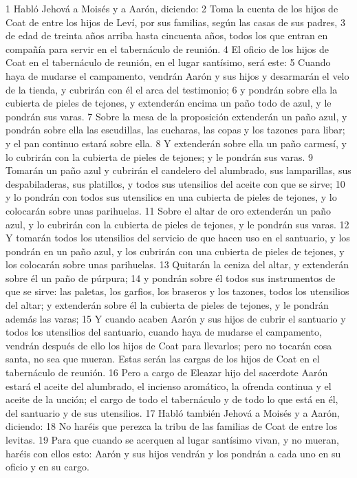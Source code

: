 1 Habló Jehová a Moisés y a Aarón, diciendo:
2 Toma la cuenta de los hijos de Coat de entre los hijos de Leví, por sus familias, según las casas de sus padres,
3 de edad de treinta años arriba hasta cincuenta años, todos los que entran en compañía para servir en el tabernáculo de reunión. 
4 El oficio de los hijos de Coat en el tabernáculo de reunión, en el lugar santísimo, será este:
5 Cuando haya de mudarse el campamento, vendrán Aarón y sus hijos y desarmarán el velo de la tienda, y cubrirán con él el arca del testimonio;
6 y pondrán sobre ella la cubierta de pieles de tejones, y extenderán encima un paño todo de azul, y le pondrán sus varas.
7 Sobre la mesa de la proposición extenderán un paño azul, y pondrán sobre ella las escudillas, las cucharas, las copas y los tazones para libar; y el pan continuo estará sobre ella.
8 Y extenderán sobre ella un paño carmesí, y lo cubrirán con la cubierta de pieles de tejones; y le pondrán sus varas.
9 Tomarán un paño azul y cubrirán el candelero del alumbrado, sus lamparillas, sus despabiladeras, sus platillos, y todos sus utensilios del aceite con que se sirve;
10 y lo pondrán con todos sus utensilios en una cubierta de pieles de tejones, y lo colocarán sobre unas parihuelas.
11 Sobre el altar de oro extenderán un paño azul, y lo cubrirán con la cubierta de pieles de tejones, y le pondrán sus varas.
12 Y tomarán todos los utensilios del servicio de que hacen uso en el santuario, y los pondrán en un paño azul, y los cubrirán con una cubierta de pieles de tejones, y los colocarán sobre unas parihuelas.
13 Quitarán la ceniza del altar, y extenderán sobre él un paño de púrpura;
14 y pondrán sobre él todos sus instrumentos de que se sirve: las paletas, los garfios, los braseros y los tazones, todos los utensilios del altar; y extenderán sobre él la cubierta de pieles de tejones, y le pondrán además las varas;
15 Y cuando acaben Aarón y sus hijos de cubrir el santuario y todos los utensilios del santuario, cuando haya de mudarse el campamento, vendrán después de ello los hijos de Coat para llevarlos; pero no tocarán cosa santa, no sea que mueran. Estas serán las cargas de los hijos de Coat en el tabernáculo de reunión.
16 Pero a cargo de Eleazar hijo del sacerdote Aarón estará el aceite del alumbrado, el incienso aromático, la ofrenda continua y el aceite de la unción; el cargo de todo el tabernáculo y de todo lo que está en él, del santuario y de sus utensilios.
17 Habló también Jehová a Moisés y a Aarón, diciendo:
18 No haréis que perezca la tribu de las familias de Coat de entre los levitas. 
19 Para que cuando se acerquen al lugar santísimo vivan, y no mueran, haréis con ellos esto: Aarón y sus hijos vendrán y los pondrán a cada uno en su oficio y en su cargo.
